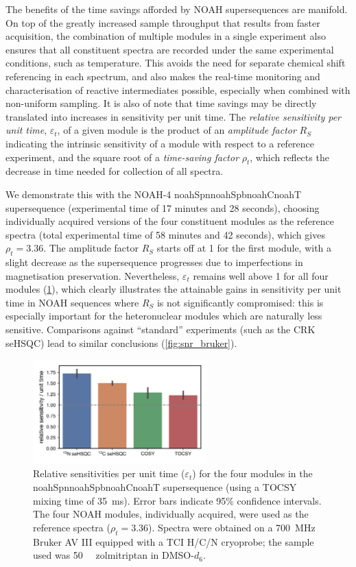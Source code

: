 \documentclass[11pt]{article}
\newcommand*{\noahfour}[4]{\csname noah#1\endcsname\csname noah#2\endcsname\csname noah#3\endcsname\csname noah#4\endcsname}
\newcommand*{\zolmi}{Spectra were obtained on a \SI{700}{\MHz} Bruker AV III equipped with a TCI H/C/N cryoprobe; the sample used was \SI{50}{\milli\molar} zolmitriptan in DMSO-$d_6$.}
\begin{document}
\begin{refsection}
The benefits of the time savings afforded by NOAH supersequences are manifold.
On top of the greatly increased sample throughput that results from faster acquisition, the combination of multiple modules in a single experiment also ensures that all constituent spectra are recorded under the same experimental conditions, such as temperature.
This avoids the need for separate chemical shift referencing in each spectrum, and also makes the real-time monitoring and characterisation of reactive intermediates possible, especially when combined with non-uniform sampling.
It is also of note that time savings may be directly translated into increases in sensitivity per unit time.
The \textit{relative sensitivity per unit time}, $\varepsilon_t$, of a given module is the product of an \textit{amplitude factor} $R_S$ indicating the intrinsic sensitivity of a module with respect to a reference experiment, and the square root of a \textit{time-saving factor} $\rho_t$, which reflects the decrease in time needed for collection of all spectra.\autocite{Kupce2019JMR}

We demonstrate this with the NOAH-4 \noahfour{Spn}{Spb}{C}{T} supersequence (experimental time of 17 minutes and 28 seconds), choosing individually acquired versions of the four constituent modules as the reference spectra (total experimental time of 58 minutes and 42 seconds), which gives $\rho_t = 3.36$.
The amplitude factor $R_S$ starts off at 1 for the first module, with a slight decrease as the supersequence progresses due to imperfections in magnetisation preservation.
Nevertheless, $\varepsilon_t$ remains well above 1 for all four modules (\cref{fig:snr_modules}), which clearly illustrates the attainable gains in sensitivity per unit time in NOAH sequences where $R_S$ is not significantly compromised: this is especially important for the heteronuclear modules which are naturally less sensitive.
Comparisons against ``standard'' experiments (such as the CRK seHSQC) lead to similar conclusions (\cref{fig:snr_bruker}).

\begin{figure}
    \centering
    \includegraphics[width=0.6\textwidth]{snr_modules.png}
    \caption{
        Relative sensitivities per unit time ($\varepsilon_t$) for the four modules in the \noahfour{Spn}{Spb}{C}{T} supersequence (using a TOCSY mixing time of \SI{35}{\ms}).
        Error bars indicate 95\% confidence intervals.
        The four NOAH modules, individually acquired, were used as the reference spectra ($\rho_t = 3.36$).
        \zolmi{}
    }
    \label{fig:snr_modules}
\end{figure}


\end{refsection}
\end{document}
